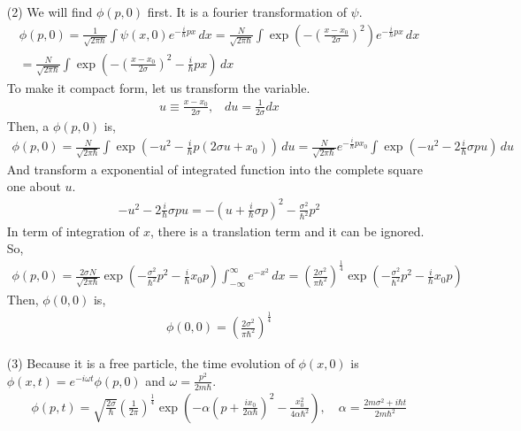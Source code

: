 \documentclass[aps,floatfix,nofootinbib,superscriptaddress,fleqn]{revtex4}
\begin{document}
\begin{itemize}
  \item[(2)] We will find $\phi(p,0)$ first. It is a fourier transformation of $\psi$.
    \begin{align}
      \phi(p,0)=\frac{1}{\sqrt{2\pi\hbar}}\int\psi(x,0) e^{-\frac{i}{\hbar}px}\,dx
      =\frac{N}{\sqrt{2\pi\hbar}}\int\exp\left(-{\left(\frac{x-x_0}{2\sigma}\right)}^2\right) e^{-\frac{i}{\hbar}px}\,dx
      \\=\frac{N}{\sqrt{2\pi\hbar}}\int\exp\left(-{\left(\frac{x-x_0}{2\sigma}\right)}^2-\frac{i}{\hbar}px\right)\,dx
    \end{align}
  To make it compact form, let us transform the variable.
    \begin{align}
      u \equiv \frac{x-x_0}{2\sigma},\;\;\; du = \frac{1}{2\sigma} dx 
    \end{align}
  Then, a $\phi(p,0)$ is,
  \begin{align}
    \phi(p,0)=\frac{N}{\sqrt{2\pi\hbar}}\int\exp\left(-{u}^2-\frac{i}{\hbar}p(2\sigma u+x_0)\right)\,du
             =\frac{N}{\sqrt{2\pi\hbar}}e^{-\frac{i}{\hbar}px_0}\int\exp\left(-u^2-2\frac{i}{\hbar}\sigma pu\right)\,du
  \end{align}
  And transform a exponential of integrated function into the complete square one about $u$.
    \begin{align}
      -u^2-2\frac{i}{\hbar}\sigma pu = -{\left( u+\frac{i}{\hbar}\sigma p\right)}^2-\frac{\sigma^2}{\hbar^2}p^2
    \end{align}
  In term of integration of $x$, there is a translation term and it can be ignored. So,
    \begin{align}
      \phi(p,0) = \frac{2\sigma N}{\sqrt{2\pi\hbar}}\exp\left(-\frac{\sigma^2}{\hbar^2}p^2-\frac{i}{\hbar}x_0p\right)\int_{-\infty}^{\infty} e^{-x^2}\,dx
                = {\left(\frac{2\sigma^2}{\pi\hbar^2}\right)}^{\frac{1}{4}}\exp\left(-\frac{\sigma^2}{\hbar^2}p^2-\frac{i}{\hbar}x_0p\right)
    \end{align}
  Then, $\phi(0,0)$ is,
    \begin{align}
      \phi(0,0)={\left(\frac{2\sigma^2}{\pi\hbar^2}\right)}^{\frac{1}{4}}
    \end{align}

  \item[(3)] Because it is a free particle, the time evolution of $\phi(x,0)$ is $\phi(x,t)=e^{-i\omega t}\phi(p,0)$ and $\omega = \frac{p^2}{2m\hbar}$.
    \begin{align}
      \phi (p,t) = \sqrt{\frac{2\sigma }{\hbar}}{\left(\frac{1}{2\pi}\right)}^{\frac{1}{4}}\exp\left(-\alpha{\left(p+\frac{ix_0}{2\alpha\hbar}\right)}^2 
                  -\frac{x_0^2}{4\alpha\hbar^2}\right),
      \quad \alpha = \frac{2m\sigma^2+i\hbar t}{2m\hbar^2}
    \end{align} 


\end{itemize}
\end{document}
